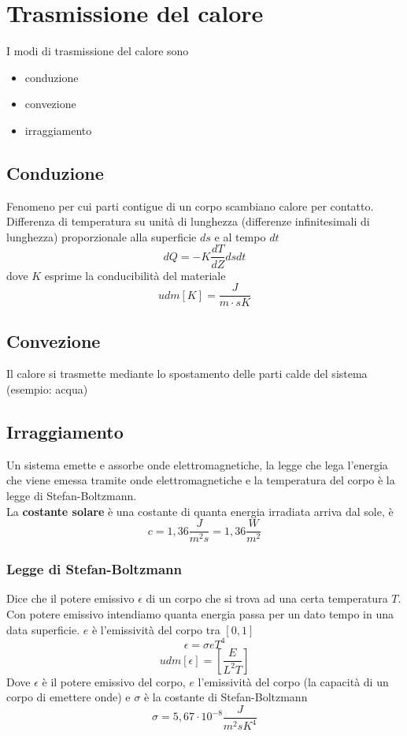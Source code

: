\documentclass[a4paper]{report}
\begin{document}
  \section{Trasmissione del calore}
  I modi di trasmissione del calore sono
  \begin{itemize}
    \item conduzione
    \item convezione
    \item irraggiamento
  \end{itemize}
  \subsection{Conduzione}
  Fenomeno per cui parti contigue di un corpo scambiano calore per contatto. Differenza di temperatura su unità di lunghezza (differenze infinitesimali di lunghezza) proporzionale alla superficie $ds$ e al tempo $dt$
  $$ dQ = -K \frac{dT}{dZ} ds dt $$
  dove $K$ esprime la conducibilità del materiale
  $$ udm[K] = \frac{J}{m\cdot sK} $$
  \subsection{Convezione}
  Il calore si trasmette mediante lo spostamento delle parti calde del sistema (esempio: acqua)
  \subsection{Irraggiamento}
  Un sistema emette e assorbe onde elettromagnetiche, la legge che lega l'energia che viene emessa tramite onde elettromagnetiche e la temperatura del corpo è la legge di Stefan-Boltzmann.\\
  La \textbf{costante solare} è una costante di quanta energia irradiata arriva dal sole, è
  $$c = 1,36 \frac{J}{m^2 s}= 1,36 \frac{W}{m^2}$$
  \subsubsection{Legge di Stefan-Boltzmann}
  Dice che il potere emissivo $\epsilon$ di un corpo che si trova ad una certa temperatura $T$. Con potere emissivo intendiamo quanta energia passa per un dato tempo in una data superficie. $e$ è l'emissività del corpo tra $[0,1]$
  $$\epsilon = \sigma e T^4$$
  $$ udm[\epsilon] = [\frac{E}{L^2T}] $$
  Dove $\epsilon$ è il potere emissivo del corpo, $e$ l'emissività del corpo (la capacità di un corpo di emettere onde) e $\sigma$ è la costante di Stefan-Boltzmann
  $$ \sigma = 5,67 \cdot 10^{-8} \frac{J}{m^2sK^4} $$
\end{document}
